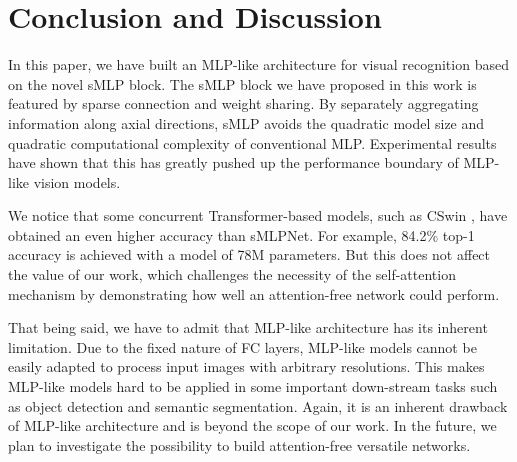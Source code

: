 \documentclass[letterpaper]{article} \usepackage{aaai22}  \usepackage{times}  \usepackage{helvet}  \usepackage{courier}  \usepackage[hyphens]{url}  \usepackage{graphicx} \usepackage{color}
\begin{document}
\section{Conclusion and Discussion}
In this paper, we have built an MLP-like architecture for visual recognition based on the novel sMLP block. The sMLP block we have proposed in this work is featured by sparse connection and weight sharing. By separately aggregating information along axial directions, sMLP avoids the quadratic model size and quadratic computational complexity of conventional MLP. Experimental results have shown that this has greatly pushed up the performance boundary of MLP-like vision models.

We notice that some concurrent Transformer-based models, such as CSwin \cite{dong2021cswin}, have obtained an even higher accuracy than sMLPNet. For example, 84.2\% top-1 accuracy is achieved with a model of 78M parameters. But this does not affect the value of our work, which challenges the necessity of the self-attention mechanism by demonstrating how well an attention-free network could perform. 

That being said, we have to admit that MLP-like architecture has its inherent limitation. Due to the fixed nature of FC layers, MLP-like models cannot be easily adapted to process input images with arbitrary resolutions. This makes MLP-like models hard to be applied in some important down-stream tasks such as object detection and semantic segmentation. Again, it is an inherent drawback of MLP-like architecture and is beyond the scope of our work. In the future, we plan to investigate the possibility to build attention-free versatile networks. 







\appendix
\label{sec:reference_examples}

\nobibliography*

\end{document}
